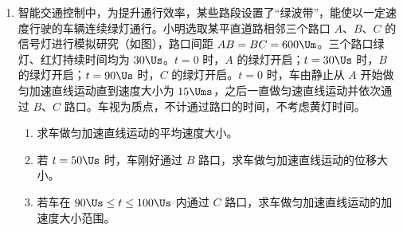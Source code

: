 \documentclass[\gkver]{gaokaozhenti}
\begin{document}
\begin{enumerate}
{（3）刨子由静止开始做匀加速直线运动，由运动学公式 $v^{2}=2aL$

可得末速度 $v=\sqrt{2aL}$

根据动量定理，合力的冲量等于物体动量的变化量，初动量为 0，因此合力冲量 $I=\Delta p=Mv-0=M\sqrt{2aL}$
}
\item
智能交通控制中，为提升通行效率，某些路段设置了“绿波带”，能使以一定速度行驶的车辆连续绿灯通行。小明选取某平直道路相邻三个路口 $A$、$B$、$C$ 的信号灯进行模拟研究（如图），路口间距 $AB=BC=600 \Um$。三个路口绿灯、红灯持续时间均为 $30 \Us$。$t=0$ 时，$A$ 的绿灯开启；$t=30 \Us$ 时，$B$ 的绿灯开启；$t=90 \Us$ 时，$C$ 的绿灯开启。$t=0$ 时，车由静止从 $A$ 开始做匀加速直线运动直到速度大小为 $15 \Ums$，之后一直做匀速直线运动并依次通过 $B$、$C$ 路口。车视为质点，不计通过路口的时间，不考虑黄灯时间。
\begin{enumerate}
	\item
	求车做匀加速直线运动的平均速度大小。
	\item
	若 $t=50 \Us$ 时，车刚好通过 $B$ 路口，求车做匀加速直线运动的位移大小。
	\item
	若车在 $90 \Us\leq t\leq100 \Us$ 内通过 $C$ 路口，求车做匀加速直线运动的加速度大小范围。
\end{enumerate}
\onepicture[w=10cm, align=right]{}

\end{enumerate}
\end{document}
